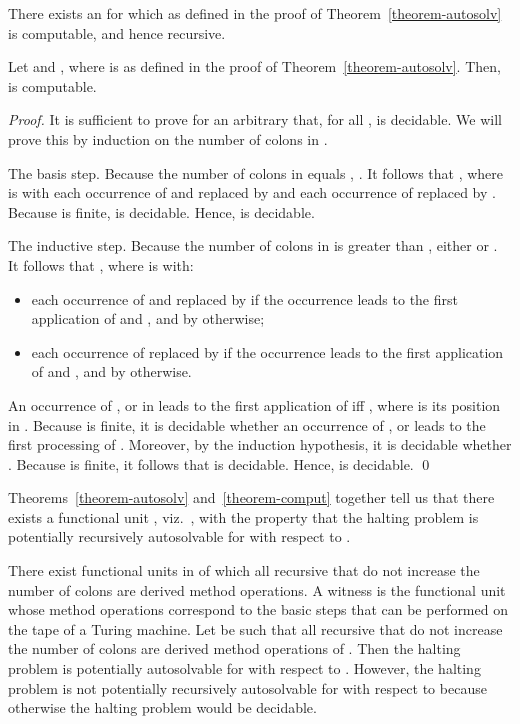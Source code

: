 \documentclass[fleqn]{llncs}
\begin{document}
There exists an  for which  as defined in
the proof of Theorem~\ref{theorem-autosolv} is computable, and hence
recursive.
\begin{theorem}
\label{theorem-comput}
Let  and
, where
 is as defined in the proof
of Theorem~\ref{theorem-autosolv}.
Then,  is computable.
\end{theorem}
\begin{proof}
It is sufficient to prove for an arbitrary  that,
for all ,  is decidable.
We will prove this by induction on the number of colons in .

The basis step.
Because the number of colons in  equals ,
.
It follows that ,
where  is  with each occurrence of  and
 replaced by  and each occurrence of
 replaced by .
Because  is finite,  is decidable.
Hence,  is decidable.

The inductive step.
Because the number of colons in  is greater than , either
 or
.
It follows that , where
 is  with:
\begin{itemize}
\item
each occurrence of  and  replaced by
 if the occurrence leads to the first application of
 and , and by  otherwise;
\item
each occurrence of  replaced by
 if the occurrence leads to the first application of
 and , and by  otherwise.
\end{itemize}
An occurrence of ,  or
 in  leads to the first application of 
iff , where  is its position in .
Because  is finite, it is decidable whether an occurrence of
,  or  leads to the
first processing of .
Moreover, by the induction hypothesis, it is decidable whether
.
Because  is finite, it follows that  is decidable.
Hence,  is decidable.
\qed
\end{proof}
Theorems~\ref{theorem-autosolv} and~\ref{theorem-comput} together tell
us that there exists a functional unit , viz.\
, with the property that the halting problem is potentially
recursively autosolvable for  with respect to .

There exist functional units in  of which all recursive
 that do not increase the number of colons are derived
method operations.
A witness is the functional unit whose method operations correspond to
the basic steps that can be performed on the tape of a Turing machine.
Let  be such that all recursive 
that do not increase the number of colons are derived method operations
of .
Then the halting problem is potentially autosolvable for 
with respect to .
However, the halting problem is not potentially recursively autosolvable
for  with respect to  because otherwise the halting
problem would be decidable.
\end{document}
